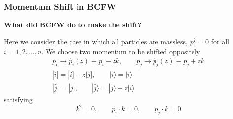 \documentclass{beamer}
\newcommand{\aket}[1]{|#1\rangle}
\newcommand{\sket}[1]{|#1]}
\begin{document}
\begin{frame}
    \frametitle{Momentum Shift in BCFW}
    \textbf{What did BCFW do to make the shift?}

    Here we consider the case in which all particles are massless, $p_i^2 = 0$ for all $i = 1, 2, \dotsc, n$. We choose two momentum to be shifted oppositely 
    \begin{gather*}
        p_i\rightarrow\hat{p}_i(z)\equiv p_i-zk,\qquad p_j\rightarrow\hat{p}_j(z)\equiv p_j+zk\\
        \sket{\hat{i}}=\sket{i}-z\sket{j},\qquad \aket{\hat{i}}=\aket{i}\\
        \sket{\hat{j}}=\sket{j},\qquad \aket{\hat{j}}=\aket{j}+z\aket{i}
    \end{gather*}
    satisfying 
    \begin{equation*}
        k^2=0,\qquad p_i\cdot k=0,\qquad p_j\cdot k=0
    \end{equation*}
\vspace{-1.5em}
\begin{figure}
    \centering
    \begin{minipage}{0.45\textwidth}

\begin{tikzpicture}[scale=0.7,x=0.75pt,y=0.75pt,yscale=-1,xscale=1]


\end{tikzpicture}
\end{minipage}
\end{figure}
\end{frame}
\end{document}
